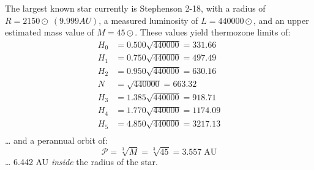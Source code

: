 \documentclass[
  letterpaper,
]{book}
\begin{document}
The largest known star currently is Stephenson 2-18, with a radius of
\(R = 2150⊙\;(9.999AU)\), a measured luminosity of \(L = 440000⊙\), and
an upper estimated mass value of \(M = 45⊙\). These values yield
thermozone limits of: \[
\begin{align}
H_0 &= 0.500\sqrt{440000} = 331.66 \\
H_1 &= 0.750\sqrt{440000} = 497.49 \\
H_2 &= 0.950\sqrt{440000} = 630.16 \\
N &= \sqrt{440000} = 663.32 \\
H_3 &= 1.385\sqrt{440000} = 918.71 \\
H_4 &= 1.770\sqrt{440000} = 1174.09 \\
H_5 &= 4.850\sqrt{440000} = 3217.13 \\
\end{align}
\] \ldots{} and a perannual orbit of: \[
\mathcal{P} = \sqrt[3]{M} = \sqrt[3]{45} = 3.557\;\text{AU}
\] \ldots{} 6.442 AU \emph{inside} the radius of the star.
\end{document}
